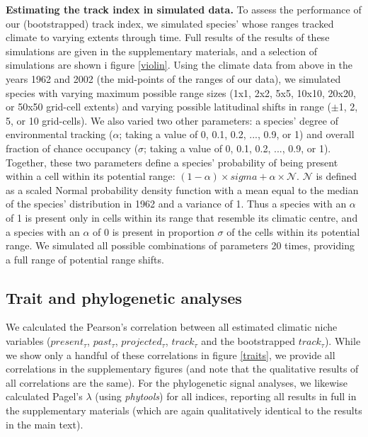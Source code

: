 \documentclass[12pt]{report}
\begin{document}
\textbf{Estimating the track index in simulated data.} To assess the
performance of our (bootstrapped) track index, we simulated species'
whose ranges tracked climate to varying extents through time. Full
results of the results of these simulations are given in the
supplementary materials, and a selection of simulations are shown i
figure \ref{violin}. Using the climate data from above in the years
1962 and 2002 (the mid-points of the ranges of our data), we simulated
species with varying maximum possible range sizes (1x1, 2x2, 5x5,
10x10, 20x20, or 50x50 grid-cell extents) and varying possible
latitudinal shifts in range ($\pm$1, 2, 5, or 10 grid-cells). We also
varied two other parameters: a species' degree of environmental
tracking ($\alpha$; taking a value of 0, 0.1, 0.2, ..., 0.9, or 1) and
overall fraction of chance occupancy ($\sigma$; taking a value of 0,
0.1, 0.2, ..., 0.9, or 1). Together, these two parameters define a
species' probability of being present within a cell within its
potential range:
$(1-\alpha) \times sigma + \alpha \times \mathcal{N}$.  $\mathcal{N}$
is defined as a scaled Normal probability density function with a mean
equal to the median of the species' distribution in 1962 and a
variance of 1. Thus a species with an $\alpha$ of 1 is present only in
cells within its range that resemble its climatic centre, and a
species with an $\alpha$ of 0 is present in proportion $\sigma$ of the
cells within its potential range. We simulated all possible
combinations of parameters 20 times, providing a full range of
potential range shifts.

\subsection*{Trait and phylogenetic analyses}

We calculated the Pearson's correlation between all estimated climatic
niche variables ($present_\tau$, $past_\tau$, $projected_\tau$,
$track_\tau$ and the bootstrapped $track_\tau$). While we show only a
handful of these correlations in figure \ref{traits}, we provide all
correlations in the supplementary figures (and note that the
qualitative results of all correlations are the same). For the
phylogenetic signal analyses, we likewise calculated Pagel's $\lambda$
(using \emph{phytools}\supercite{Revell2012phytools}) for all indices,
reporting all results in full in the supplementary materials (which
are again qualitatively identical to the results in the main text).

\printbibliography
\end{document}
